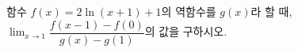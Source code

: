 함수 $f(x)=2\ln(x+1)+1$의 역함수를 $g(x)$라 할 때, $\displaystyle\lim_{x\to 1}\dfrac{f(x-1)-f(0)}{g(x)-g(1)}$의 값을 구하시오.
